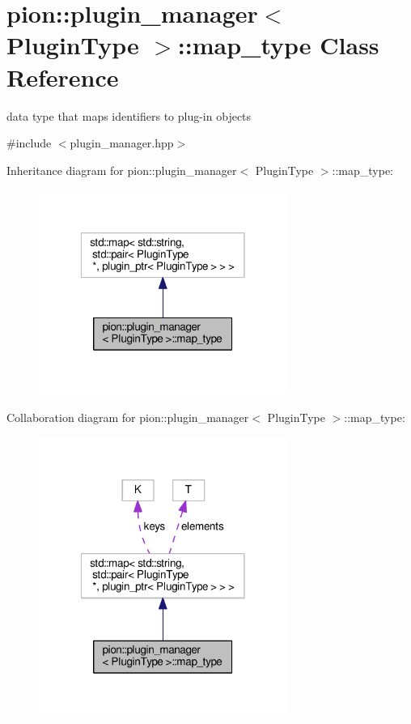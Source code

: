 \hypertarget{classpion_1_1plugin__manager_1_1map__type}{\section{pion\-:\-:plugin\-\_\-manager$<$ Plugin\-Type $>$\-:\-:map\-\_\-type Class Reference}
\label{classpion_1_1plugin__manager_1_1map__type}
}


data type that maps identifiers to plug-\/in objects  




{\ttfamily \#include $<$plugin\-\_\-manager.\-hpp$>$}



Inheritance diagram for pion\-:\-:plugin\-\_\-manager$<$ Plugin\-Type $>$\-:\-:map\-\_\-type\-:
\nopagebreak
\begin{figure}[H]
\begin{center}
\leavevmode
\includegraphics[width=230pt]{classpion_1_1plugin__manager_1_1map__type__inherit__graph}
\end{center}
\end{figure}


Collaboration diagram for pion\-:\-:plugin\-\_\-manager$<$ Plugin\-Type $>$\-:\-:map\-\_\-type\-:
\nopagebreak
\begin{figure}[H]
\begin{center}
\leavevmode
\includegraphics[width=230pt]{classpion_1_1plugin__manager_1_1map__type__coll__graph}
\end{center}
\end{figure}
